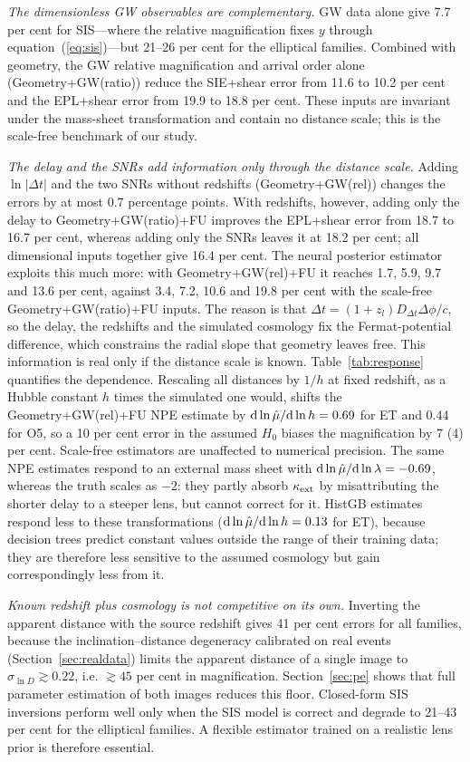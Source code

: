 \emph{The dimensionless GW observables are complementary.} GW data alone give 7.7 per cent for SIS---where the relative magnification fixes $y$ through equation~(\ref{eq:sis})---but 21--26 per cent for the elliptical families. Combined with geometry, the GW relative magnification and arrival order alone (Geometry+GW(ratio)) reduce the SIE+shear error from 11.6 to 10.2 per cent and the EPL+shear error from 19.9 to 18.8 per cent. These inputs are invariant under the mass-sheet transformation and contain no distance scale; this is the scale-free benchmark of our study.

\emph{The delay and the SNRs add information only through the distance scale.} Adding $\ln|\Delta t|$ and the two SNRs without redshifts (Geometry+GW(rel)) changes the errors by at most 0.7 percentage points. With redshifts, however, adding only the delay to Geometry+GW(ratio)+FU improves the EPL+shear error from 18.7 to 16.7 per cent, whereas adding only the SNRs leaves it at 18.2 per cent; all dimensional inputs together give 16.4 per cent. The neural posterior estimator exploits this much more: with Geometry+GW(rel)+FU it reaches 1.7, 5.9, 9.7 and 13.6 per cent, against 3.4, 7.2, 10.6 and 19.8 per cent with the scale-free Geometry+GW(ratio)+FU inputs. The reason is that $\Delta t=(1+z_l)D_{\Delta t}\Delta\phi/c$, so the delay, the redshifts and the simulated cosmology fix the Fermat-potential difference, which constrains the radial slope that geometry leaves free. This information is real only if the distance scale is known. Table~\ref{tab:response} quantifies the dependence. Rescaling all distances by $1/h$ at fixed redshift, as a Hubble constant $h$ times the simulated one would, shifts the Geometry+GW(rel)+FU NPE estimate by ${\rm d}\ln\hat\mu/{\rm d}\ln h=0.69$ for ET and 0.44 for O5, so a 10 per cent error in the assumed $H_0$ biases the magnification by 7 (4) per cent. Scale-free estimators are unaffected to numerical precision. The same NPE estimates respond to an external mass sheet with ${\rm d}\ln\hat\mu/{\rm d}\ln\lambda=-0.69$, whereas the truth scales as $-2$: they partly absorb $\kappa_{\rm ext}$ by misattributing the shorter delay to a steeper lens, but cannot correct for it. HistGB estimates respond less to these transformations (${\rm d}\ln\hat\mu/{\rm d}\ln h=0.13$ for ET), because decision trees predict constant values outside the range of their training data; they are therefore less sensitive to the assumed cosmology but gain correspondingly less from it.

\emph{Known redshift plus cosmology is not competitive on its own.} Inverting the apparent distance with the source redshift gives 41 per cent errors for all families, because the inclination--distance degeneracy calibrated on real events (Section~\ref{sec:realdata}) limits the apparent distance of a single image to $\sigma_{\ln D}\gtrsim0.22$, i.e. $\gtrsim45$ per cent in magnification. Section~\ref{sec:pe} shows that full parameter estimation of both images reduces this floor. Closed-form SIS inversions perform well only when the SIS model is correct and degrade to 21--43 per cent for the elliptical families. A flexible estimator trained on a realistic lens prior is therefore essential.

